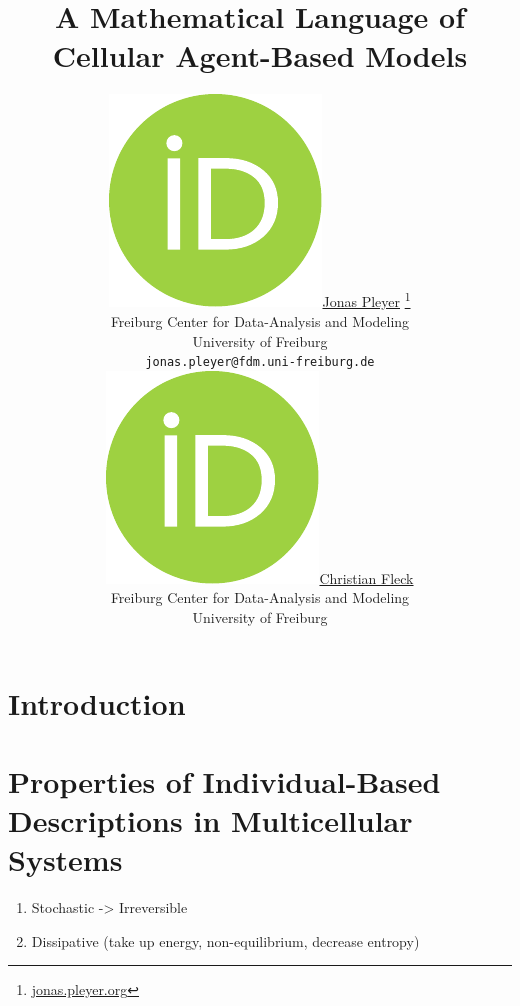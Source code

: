 \documentclass{article}
\title{
    A Mathematical Language of\\
    Cellular Agent-Based Models
}
\author{
    \href{https://orcid.org/0009-0001-0613-7978}{\includegraphics[scale=0.06]{orcid.pdf}\hspace{1mm}Jonas Pleyer}
    \thanks{\href{https://jonas.pleyer.org}{jonas.pleyer.org}} \\
	    Freiburg Center for Data-Analysis and Modeling\\
	    University of Freiburg\\
	    \texttt{jonas.pleyer@fdm.uni-freiburg.de} \\
	\And
	\href{https://orcid.org/0000-0000-0000-0000}{\includegraphics[scale=0.06]{orcid.pdf}\hspace{1mm}Christian Fleck} \\
	    Freiburg Center for Data-Analysis and Modeling\\
	    University of Freiburg
}
\begin{document}
\maketitle

\begin{abstract}
\end{abstract}




\section{Introduction}

\section{Properties of Individual-Based Descriptions in Multicellular Systems}
\label{sec:properties}
\begin{enumerate}
    \item Stochastic -> Irreversible
    \item Dissipative (take up energy, non-equilibrium, decrease entropy)
\end{enumerate}
\end{document}
